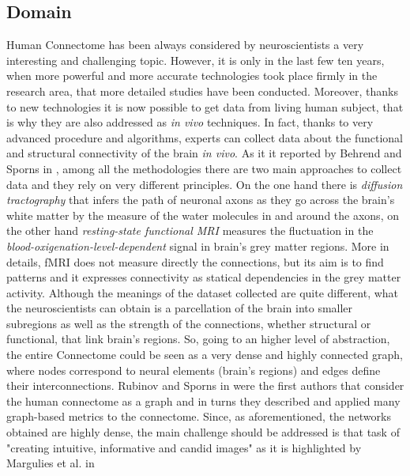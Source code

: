 \documentclass{article}
\begin{document}
\begin{multicols}{2}
\section{Domain}
Human Connectome has been always considered by neuroscientists a very interesting and challenging topic. However, it is only in the last few ten years, when more powerful and more accurate technologies took place firmly in the research area, that more detailed studies have been conducted. Moreover, thanks to new technologies it is now possible to get data from living human subject, that is why they are also addressed as \textit{in vivo} techniques. In fact, thanks to very advanced procedure and algorithms, experts can collect data about the functional and structural connectivity of the brain \textit{in vivo}. As it it reported by Behrend and Sporns in \cite{humanConnectomics}, among all the methodologies there are two main approaches to collect data and they rely on very different principles. On the one hand there is \textit{diffusion tractography} that infers the path of neuronal axons as they go across the brain's white matter by the measure of the water molecules in and around the axons, on the other hand \textit{resting-state functional MRI} measures the fluctuation in the \textit{blood-oxigenation-level-dependent} signal in brain's grey matter regions. More in details, fMRI does not measure directly the connections, but its aim is to find patterns and it expresses connectivity as statical dependencies in the grey matter activity. Although the meanings of the dataset collected are quite different, what the neuroscientists can obtain is a parcellation of the brain into smaller subregions as well as the strength of the connections, whether structural or functional, that link brain's regions. So, going to an higher level of abstraction, the entire Connectome could be seen as a very dense and highly connected graph, where nodes correspond to neural elements (brain's regions) and edges define their interconnections. Rubinov and Sporns in \cite{complexNetworkMeasures} were the first authors that consider the human connectome as a graph and in turns they described and applied many graph-based metrics to the connectome. Since, as aforementioned, the networks obtained are highly dense, the main challenge should be addressed is that task of "creating intuitive, informative and candid images" as it is highlighted by Margulies et al. in \cite{visualizingHumanConnectome}


\end{multicols}
\end{document}
